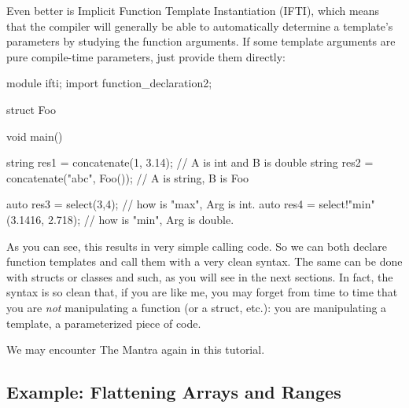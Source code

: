 Even better is Implicit Function Template Instantiation (IFTI), which means that the compiler will generally be able to automatically determine a template's parameters by studying the function arguments. If some template arguments are pure compile-time parameters, just provide them directly:

\begin{dcode}
module ifti;
import function_declaration2;

struct Foo {}

void main()
{
    string res1 = concatenate(1, 3.14); // A is int and B is double
    string res2 = concatenate("abc", Foo()); // A is string, B is Foo

    auto res3 = select(3,4); // how is "max", Arg is int.
    auto res4 = select!"min"(3.1416, 2.718); // how is "min", Arg is double.
}
\end{dcode}

As you can see, this results in very simple calling code. So we can both declare function templates and call them with a very clean syntax. The same can be done with structs or classes and such, as you will see in the next sections. In fact, the syntax is so clean that, if you are like me, you may forget from time to time that you are \emph{not} manipulating a function (or a struct, etc.): you are manipulating a template, a parameterized piece of code. 


We may encounter The Mantra again in this tutorial.

\subsection{Example: Flattening Arrays and Ranges}\label{functionflatten}

